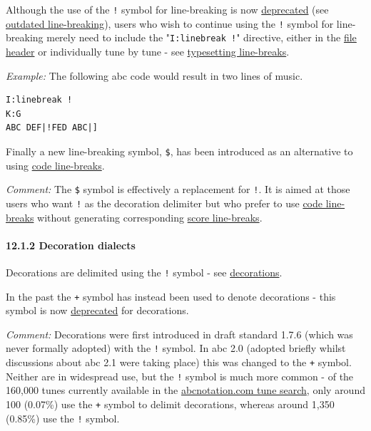 \documentclass[oneside]{book}
\let\oldparagraph\paragraph
\renewcommand{\paragraph}[1]{\oldparagraph{#1}\mbox{}}
\begin{document}
Although the use of the \texttt{!} symbol for line-breaking is now
\protect\hyperlink{outdated_syntax}{deprecated} (see
\protect\hyperlink{outdated_line-breaking}{outdated line-breaking}),
users who wish to continue using the \texttt{!} symbol for line-breaking
merely need to include the "\texttt{I:linebreak\ !}" directive, either
in the \protect\hyperlink{file_header_definition}{file header} or
individually tune by tune - see
\protect\hyperlink{typesetting_line-breaks}{typesetting line-breaks}.

\emph{Example:} The following abc code would result in two lines of
music.

\begin{verbatim}
I:linebreak !
K:G
ABC DEF|!FED ABC|]
\end{verbatim}

Finally a new line-breaking symbol, \texttt{\$}, has been introduced as
an alternative to using
\protect\hyperlink{code_line-break_definition}{code line-breaks}.

\emph{Comment:} The \texttt{\$} symbol is effectively a replacement for
\texttt{!}. It is aimed at those users who want \texttt{!} as the
decoration delimiter but who prefer to use
\protect\hyperlink{code_line-break_definition}{code line-breaks} without
generating corresponding
\protect\hyperlink{score_line-break_definition}{score line-breaks}.

\hypertarget{decoration_dialects}{\paragraph{12.1.2 Decoration
dialects}\label{decoration_dialects}}

Decorations are delimited using the \texttt{!} symbol - see
\protect\hyperlink{decorations}{decorations}.

In the past the \texttt{+} symbol has instead been used to denote
decorations - this symbol is now
\protect\hyperlink{outdated_syntax}{deprecated} for decorations.

\emph{Comment:} Decorations were first introduced in draft standard
1.7.6 (which was never formally adopted) with the \texttt{!} symbol. In
abc 2.0 (adopted briefly whilst discussions about abc 2.1 were taking
place) this was changed to the \texttt{+} symbol. Neither are in
widespread use, but the \texttt{!} symbol is much more common - of the
160,000 tunes currently available in the
\href{http://abcnotation.com/search}{abcnotation.com tune search}, only
around 100 (0.07\%) use the \texttt{+} symbol to delimit decorations,
whereas around 1,350 (0.85\%) use the \texttt{!} symbol.
\end{document}
